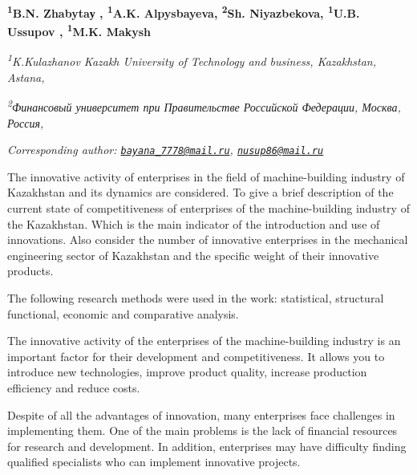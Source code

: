 
\begin{articleheader}

{\bfseries
\textsuperscript{1}B.N. Zhabytaу\textsuperscript{\envelope } \authorid,
\textsuperscript{1}A.K. Alpysbayeva\authorid,
\textsuperscript{2}Sh. Niyazbekova\authorid,
\textsuperscript{1}U.B. Ussupov\textsuperscript{\envelope } \authorid,
\textsuperscript{1}M.K. Makysh\authorid}
\end{articleheader}

\begin{affiliation}
\emph{\textsuperscript{1}K.Kulazhanov Kazakh University of Technology and business, Kazakhstan, Astana,}

\emph{\textsuperscript{2}Финансовый университет при Правительстве Российской Федерации, Москва, Россия,}

\raggedright \textsuperscript{\envelope }{\em Corresponding author: \href{mailto:bayana_7778@mail.ru}{\nolinkurl{bayana\_7778@mail.ru}}, \href{mailto:nusup86@mail.ru}{\nolinkurl{nusup86@mail.ru}}}
\end{affiliation}

The innovative activity of enterprises in the field of machine-building
industry of Kazakhstan and its dynamics are considered. To give a brief
description of the current state of competitiveness of enterprises of
the machine-building industry of the Kazakhstan. Which is the main
indicator of the introduction and use of innovations. Also consider the
number of innovative enterprises in the mechanical engineering sector of
Kazakhstan and the specific weight of their innovative products.

The following research methods were used in the work: statistical,
structural functional, economic and comparative analysis.

The innovative activity of the enterprises of the machine-building
industry is an important factor for their development and
competitiveness. It allows you to introduce new technologies, improve
product quality, increase production efficiency and reduce costs.

Despite of all the advantages of innovation, many enterprises face
challenges in implementing them. One of the main problems is the lack of
financial resources for research and development. In addition,
enterprises may have difficulty finding qualified specialists who can
implement innovative projects.

